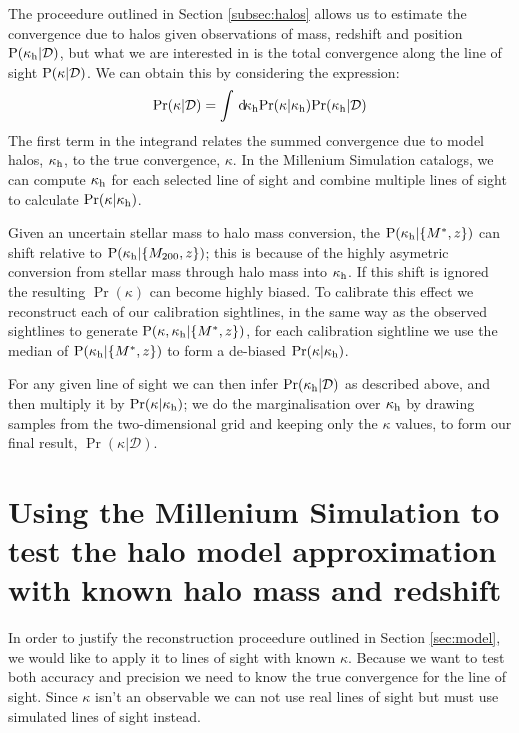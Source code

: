 \documentclass[useAMS,usenatbib]{mn2e}
\begin{document}
The proceedure outlined in Section \ref{subsec:halos} allows us to estimate 
the convergence due to halos given observations of mass, redshift and position
${\rm P}(\kappa_{\rm h}|\mathcal{D})$, but what we are interested in is the total convergence
along the line of sight ${\rm P}(\kappa|\mathcal{D})$. We can obtain this by
considering the expression:
\begin{equation}
{\rm Pr}(\kappa|\mathcal{D}) = \int \, \mathrm{d} \!\kappa_{\rm h} 
   {\rm Pr}(\kappa|\kappa_{\rm h}) {\rm Pr}(\kappa_{\rm h}|\mathcal{D})
\label{eq:kappaconv}   
\end{equation}
The first term in the integrand relates the summed convergence due to model
halos, $\kappa_{\rm h}$, to the true convergence, $\kappa$. In the Millenium
Simulation catalogs, we can compute $\kappa_{\rm h}$ for each
selected line of sight and combine multiple lines of sight to calculate ${\rm Pr}(\kappa|\kappa_{\rm h})$.

Given an uncertain stellar mass to halo mass conversion, the
${\rm P}(\kappa_{\rm h}|\{M^{*},z\})$ can shift  relative to
${\rm P}(\kappa_{\rm h}|\{M_{200},z\})$; this is because of the highly asymetric
conversion from stellar mass through halo mass into $\kappa_{\rm h}$. If this shift
is ignored the resulting $\Pr(\kappa)$ can become highly biased. To calibrate
this effect we reconstruct each of our calibration sightlines, in the same way
as the observed sightlines to generate ${\rm P}(\kappa,\kappa_{\rm h}|\{M^{*},z\})$, for
each calibration sightline we use the median of ${\rm P}(\kappa_{\rm h}|\{M^{*},z\})$ to
form a de-biased ${\rm Pr}(\kappa|\kappa_{\rm h})$.

For any given line of sight we can then infer
${\rm Pr}(\kappa_{\rm h}|\mathcal{D})$ as described above, and then
multiply it by ${\rm Pr}(\kappa|\kappa_{\rm h})$; we do the marginalisation over $\kappa_{\rm h}$
by drawing samples from the two-dimensional grid and keeping only the
$\kappa$ values, to form our final result, $\Pr(\kappa|\mathcal{D})$.


\section{Using the Millenium Simulation to test the halo model approximation with known halo mass and redshift}
\label{sec:knownMh+z} 

In order to justify the reconstruction proceedure outlined in Section \ref{sec:model}, we would like to apply it to lines of sight with known $\kappa$. Because we want to test both accuracy and precision we need to know the true convergence for the line of sight. Since $\kappa$ isn't an observable we can not use real lines of sight but must use simulated lines of sight instead. 
\end{document}
